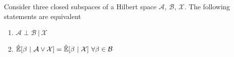 \documentclass[12pt]{article}
\newcommand{\linE}[2]{\hat{\E}[#1\ |\ #2]}  %
\begin{document}
\begin{lemma}
  \label{lem:conditional_orthogonality_equivalence}
  Consider three closed subspaces of a Hilbert space $\mathcal{A}$, $\mathcal{B}$, $\mathcal{X}$.  The following statements are equivalent

  \begin{enumerate}
    \item{$\mathcal{A} \perp \mathcal{B}\ |\ \mathcal{X}$}
    \item{$\linE{\beta}{\mathcal{A} \vee \mathcal{X}} = \linE{\beta}{\mathcal{X}}\ \forall \beta \in \mathcal{B}$}
  \end{enumerate}
\end{lemma}
\end{document}

